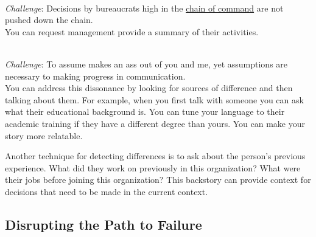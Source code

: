 \ \\
\textit{Challenge}: Decisions by bureaucrats high in the \href{https://en.wikipedia.org/wiki/Command_hierarchy}{chain of command}
are not pushed down the chain. \\
You can request management provide a summary of their activities.

\ \\
\textit{Challenge}: To assume makes an ass out of you and me, 
yet assumptions are necessary to making progress in communication.\\ 
You can address this dissonance by looking for sources of difference and then talking about them. For example, when you first talk with someone you can ask what their educational background is. You can tune your language to their academic training if they have a different degree than yours. You can make your story more relatable. 

Another technique for detecting differences is to ask about the person's previous experience. What did they work on previously in this organization? What were their jobs before joining this organization? This backstory can provide context for decisions that need to be made in the current context. 


\subsection*{Disrupting the Path to Failure}


